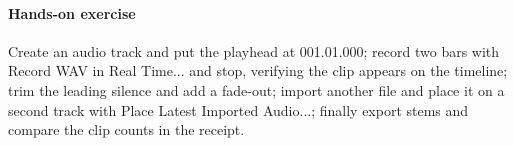 \paragraph{Hands-on exercise} Create an audio track and put the playhead at 001.01.000; record two bars with Record WAV in Real Time... and stop, verifying the clip appears on the timeline; trim the leading silence and add a fade-out; import another file and place it on a second track with Place Latest Imported Audio...; finally export stems and compare the clip counts in the receipt.
